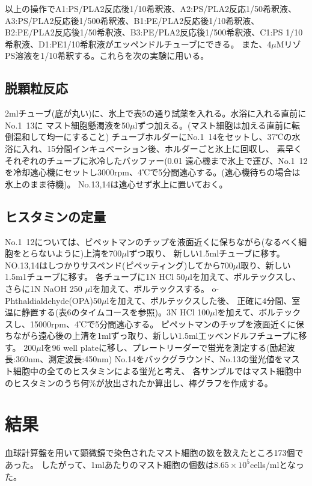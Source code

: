 \documentclass[a4paper,papersize,dvipdfmx]{jsarticle}
\begin{document}
以上の操作でA1:PS/PLA2反応後1/10希釈液、A2:PS/PLA2反応1/50希釈液、A3:PS/PLA2反応後1/500希釈液、B1:PE/PLA2反応後1/10希釈液、
B2:PE/PLA2反応後1/50希釈液、B3:PE/PLA2反応後1/500希釈液、C1:PS 1/10 希釈液、D1:PE1/10希釈液がエッペンドルチューブにできる。
また、4$\mu$MリゾPS溶液を1/10希釈する。これらを次の実験に用いる。


\subsection*{脱顆粒反応}

2mlチューブ(底が丸い)に、氷上で表5の通り試薬を入れる。水浴に入れる直前にNo.1~13に
マスト細胞懸濁液を50$\mu$lずつ加える。(マスト細胞は加える直前に転倒混和して均一にすること)
チューブホルダーにNo.1~14をセットし、37℃の水浴に入れ、15分間インキュべーション後、ホルダーごと氷上に回収し、
素早くそれぞれのチューブに氷冷したバッファー(0.01%
遠心機まで氷上で運び、No.1~12を冷却遠心機にセットし3000rpm、4℃で5分間遠心する。(遠心機待ちの場合は氷上のまま待機)。
No.13,14は遠心せず氷上に置いておく。


\subsection*{ヒスタミンの定量}

No.1~12については、ビペットマンのチップを液面近くに保ちながら(なるべく細胞をとらないように)上清を700$\mu$lずつ取り、
新しい1.5mlチューブに移す。
NO.13,14はしつかりサスペンド(ピペッティング)してから700$\mu$l取り、新しい1.5m1チューブに移す。
各チューブに1N HCl 50$\mu$lを加えて、ボルテックスし、さらに1N NaOH 250 $\mu$lを加えて、ボルテックスする。
o-Phthaldialdehyde(OPA)50$\mu$lを加えて、ボルテックスした後、
正確に4分間、室温に静置する(表6のタイムコースを参照)。3N HCl 100$\mu$lを加えて、ボルテックスし、15000rpm、4℃で5分間遠心する。
ピペットマンのチップを液面近くに保ちながら遠心後の上清を1mlずっ取り、新しい1.5ml工ッペンドルフチュープに移す。
200$\mu$lを96 well plateに移し、プレートリーダーで蛍光を測定する(励起波長:360nm、測定波長:450nm)
No.14をバックグラウンド、No.13の蛍光値をマスト細胞中の全てのヒスタミンによる蛍光と考え、
各サンプルではマスト細胞中のヒスタミンのうち何$\%$が放出されたか算出し、棒グラフを作成する。

\section*{結果}
血球計算盤を用いて顕微鏡で染色されたマスト細胞の数を数えたところ173個であった。
したがって、1mlあたりのマスト細胞の個数は$8.65 \times 10^5$cells/mlとなった。
\end{document}
